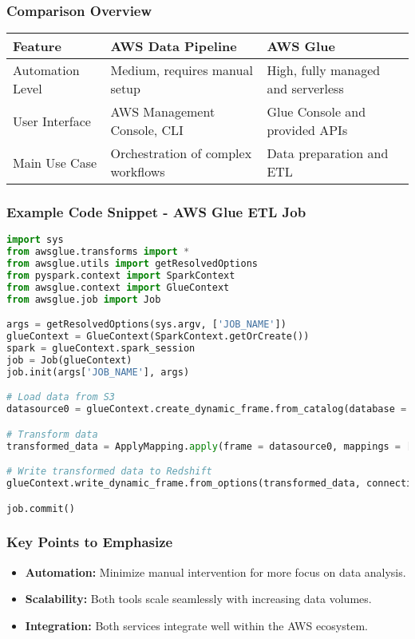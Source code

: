 \documentclass[aspectratio=169]{beamer}
\begin{document}
\begin{frame}
    \frametitle{Comparison Overview}
    \begin{table}[ht]
        \centering
        \begin{tabular}{|l|l|l|}
            \hline
            \textbf{Feature} & \textbf{AWS Data Pipeline} & \textbf{AWS Glue} \\
            \hline
            Automation Level & Medium, requires manual setup & High, fully managed and serverless \\
            \hline
            User Interface & AWS Management Console, CLI & Glue Console and provided APIs \\
            \hline
            Main Use Case & Orchestration of complex workflows & Data preparation and ETL \\
            \hline
        \end{tabular}
    \end{table}
\end{frame}

\begin{frame}[fragile]
    \frametitle{Example Code Snippet - AWS Glue ETL Job}
    \begin{lstlisting}[language=Python]
import sys
from awsglue.transforms import *
from awsglue.utils import getResolvedOptions
from pyspark.context import SparkContext
from awsglue.context import GlueContext
from awsglue.job import Job

args = getResolvedOptions(sys.argv, ['JOB_NAME'])
glueContext = GlueContext(SparkContext.getOrCreate())
spark = glueContext.spark_session
job = Job(glueContext)
job.init(args['JOB_NAME'], args)

# Load data from S3
datasource0 = glueContext.create_dynamic_frame.from_catalog(database = "your_database", table_name = "your_table")

# Transform data
transformed_data = ApplyMapping.apply(frame = datasource0, mappings = [("old_column", "string", "new_column", "string")])

# Write transformed data to Redshift
glueContext.write_dynamic_frame.from_options(transformed_data, connection_type="redshift", connection_options={"url": "jdbc:redshift://your-cluster:5439/database", "dbtable": "new_table", "user": "username", "password": "password"})

job.commit()
    \end{lstlisting}
\end{frame}

\begin{frame}
    \frametitle{Key Points to Emphasize}
    \begin{itemize}
        \item \textbf{Automation:} Minimize manual intervention for more focus on data analysis.
        \item \textbf{Scalability:} Both tools scale seamlessly with increasing data volumes.
        \item \textbf{Integration:} Both services integrate well within the AWS ecosystem.
    \end{itemize}
\end{frame}
\end{document}
